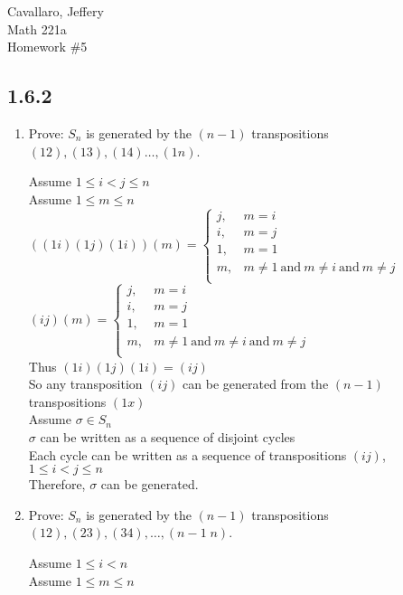 \documentclass[letterpaper,12pt,fleqn]{article}
\renewcommand{\o}{\sigma}
\begin{document}
Cavallaro, Jeffery \\
Math 221a \\
Homework \#5

\bigskip

\subsection*{1.6.2}
\begin{enumerate}[label={\alph*)}]
\item Prove: $S_n$ is generated by the $(n-1)$ transpositions
  $(12),(13),(14)\ldots,(1n)$.

  Assume $1\le i<j\le n$ \\
  Assume $1\le m\le n$ \\

  $((1i)(1j)(1i))(m)=\begin{cases}
  j, & m=i \\
  i, & m=j \\
  1, & m=1 \\
  m, & m\ne 1\ \mbox{and}\ m\ne i\ \mbox{and}\ m\ne j \\
  \end{cases}$ \\

  $(ij)(m)=\begin{cases}
  j, & m=i \\
  i, & m=j \\
  1, & m=1 \\
  m, & m\ne 1\ \mbox{and}\ m\ne i\ \mbox{and}\ m\ne j \\
  \end{cases}$ \\

  Thus $(1i)(1j)(1i)=(ij)$ \\
  So any transposition $(ij)$ can be generated from the $(n-1)$ transpositions
  $(1x)$ \\
  Assume $\o\in S_n$ \\
  $\o$ can be written as a sequence of disjoint cycles \\
  Each cycle can be written as a sequence of transpositions $(ij)$,
  $1\le i<j\le n$ \\
  Therefore, $\o$ can be generated.

\item Prove: $S_n$ is generated by the $(n-1)$ transpositions
  $(12),(23),(34),\ldots,(n-1\;n)$.

  Assume $1\le i<n$ \\
  Assume $1\le m\le n$ \\


\end{enumerate}
\end{document}

